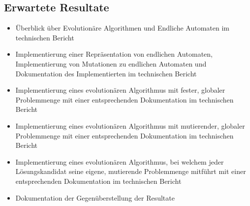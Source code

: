 \subsection{Erwartete Resultate}
\begin{itemize}
	\item Überblick über Evolutionäre Algorithmen und Endliche Automaten im technischen Bericht
	\item Implementierung einer Repräsentation von endlichen Automaten, Implementierung von Mutationen zu endlichen Automaten und Dokumentation des Implementierten im technischen Bericht 
	\item Implementierung eines evolutionären Algorithmus mit fester, globaler Problemmenge mit einer entsprechenden Dokumentation im technischen Bericht 
	\item Implementierung eines evolutionären Algorithmus mit mutierender, globaler Problemmenge mit einer entsprechenden Dokumentation im technischen Bericht 
	\item Implementierung eines evolutionären Algorithmus, bei welchem jeder Lösungskandidat seine eigene, mutierende Problemmenge mitführt mit einer entsprechenden Dokumentation im technischen Bericht 
	\item Dokumentation der Gegenüberstellung der Resultate
\end{itemize}
